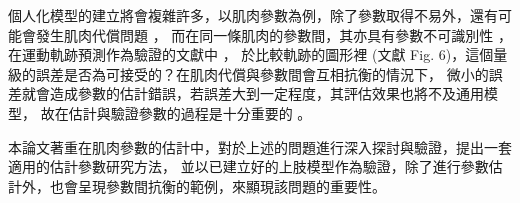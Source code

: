 個人化模型的建立將會複雜許多，以肌肉參數為例，除了參數取得不易外，還有可能會發生肌肉代償問題 \cite{xiao2010sensitivity}，
而在同一條肌肉的參數間，其亦具有參數不可識別性 \cite{bujalski2018monte}，在運動軌跡預測作為驗證的文獻中 \cite{hinson2022sensitivity}，
於比較軌跡的圖形裡 (文獻 Fig. 6)，這個量級的誤差是否為可接受的？在肌肉代償與參數間會互相抗衡的情況下，
微小的誤差就會造成參數的估計錯誤，若誤差大到一定程度，其評估效果也將不及通用模型，
故在估計與驗證參數的過程是十分重要的 \cite{hicks2015my}。

本論文著重在肌肉參數的估計中，對於上述的問題進行深入探討與驗證，提出一套適用的估計參數研究方法，
並以已建立好的上肢模型作為驗證，除了進行參數估計外，也會呈現參數間抗衡的範例，來顯現該問題的重要性。

\clearpage